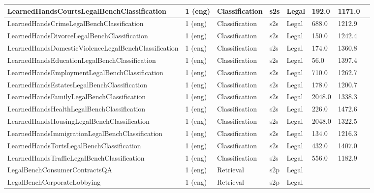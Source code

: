 \begin{longtable}{L{5.0cm}|L{1.5cm}L{1.4cm}L{1.4cm}L{1.4cm}L{1.4cm}L{1.0cm}L{1.0cm}}
 \hline 
LearnedHandsCourtsLegalBenchClassification \cite{guha2023legalbench} & 1 (eng) & Classification & s2s & Legal & 192.0 & 1171.0 \\
 \hline 
LearnedHandsCrimeLegalBenchClassification \cite{guha2023legalbench} & 1 (eng) & Classification & s2s & Legal & 688.0 & 1212.9 \\
 \hline 
LearnedHandsDivorceLegalBenchClassification \cite{guha2023legalbench} & 1 (eng) & Classification & s2s & Legal & 150.0 & 1242.4 \\
 \hline 
LearnedHandsDomesticViolenceLegalBenchClassification \cite{guha2023legalbench} & 1 (eng) & Classification & s2s & Legal & 174.0 & 1360.8 \\
 \hline 
LearnedHandsEducationLegalBenchClassification \cite{guha2023legalbench} & 1 (eng) & Classification & s2s & Legal & 56.0 & 1397.4 \\
 \hline 
LearnedHandsEmploymentLegalBenchClassification \cite{guha2023legalbench} & 1 (eng) & Classification & s2s & Legal & 710.0 & 1262.7 \\
 \hline 
LearnedHandsEstatesLegalBenchClassification \cite{guha2023legalbench} & 1 (eng) & Classification & s2s & Legal & 178.0 & 1200.7 \\
 \hline 
LearnedHandsFamilyLegalBenchClassification \cite{guha2023legalbench} & 1 (eng) & Classification & s2s & Legal & 2048.0 & 1338.3 \\
 \hline 
LearnedHandsHealthLegalBenchClassification \cite{guha2023legalbench} & 1 (eng) & Classification & s2s & Legal & 226.0 & 1472.6 \\
 \hline 
LearnedHandsHousingLegalBenchClassification \cite{guha2023legalbench} & 1 (eng) & Classification & s2s & Legal & 2048.0 & 1322.5 \\
 \hline 
LearnedHandsImmigrationLegalBenchClassification \cite{guha2023legalbench} & 1 (eng) & Classification & s2s & Legal & 134.0 & 1216.3 \\
 \hline 
LearnedHandsTortsLegalBenchClassification \cite{guha2023legalbench} & 1 (eng) & Classification & s2s & Legal & 432.0 & 1407.0 \\
 \hline 
LearnedHandsTrafficLegalBenchClassification \cite{guha2023legalbench} & 1 (eng) & Classification & s2s & Legal & 556.0 & 1182.9 \\
 \hline 
LegalBenchConsumerContractsQA \cite{koreeda2021contractnli} & 1 (eng) & Retrieval & s2p & Legal &  &  \\
 \hline 
LegalBenchCorporateLobbying \cite{guha2023legalbench} & 1 (eng) & Retrieval & s2p & Legal &  &  \\

\end{longtable}
